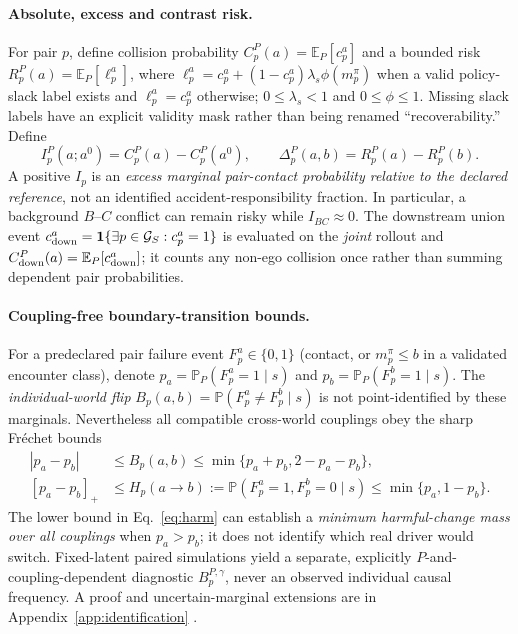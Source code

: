 \documentclass[10pt]{article}
\newcommand{\E}{\mathbb{E}}
\newcommand{\Prob}{\mathbb{P}}
\newcommand{\ind}{\mathbf{1}}
\newcommand{\cG}{\mathcal{G}}\newcommand{\cK}{\mathcal{K}}
\newcommand{\relu}[1]{\left[#1\right]_+}
\begin{document}
\paragraph{Absolute, excess and contrast risk.}
For pair $p$, define collision probability $C_p^P(a)=\E_P[c_p^a]$ and a bounded risk $R_p^P(a)=\E_P[\ell_p^a]$, where $\ell_p^a=c_p^a+(1-c_p^a)\lambda_s\phi(m_p^\pi)$ when a valid policy-slack label exists and $\ell_p^a=c_p^a$ otherwise; $0\leq\lambda_s<1$ and $0\leq\phi\leq1$. Missing slack labels have an explicit validity mask rather than being renamed ``recoverability.'' Define
\begin{equation}
 I_p^P(a;a^0)=C_p^P(a)-C_p^P(a^0),\qquad
 \Delta_p^P(a,b)=R_p^P(a)-R_p^P(b).
 \label{eq:risk}
\end{equation}
A positive $I_p$ is an \emph{excess marginal pair-contact probability relative to the declared reference}, not an identified accident-responsibility fraction. In particular, a background $B$--$C$ conflict can remain risky while $I_{BC}\approx0$. The downstream union event $c_{\rm down}^a=\ind\{\exists p\in\cG_S:c_p^a=1\}$ is evaluated on the \emph{joint} rollout and $C_{\rm down}^P(a)=\E_P[c_{\rm down}^a]$; it counts any non-ego collision once rather than summing dependent pair probabilities.

\paragraph{Coupling-free boundary-transition bounds.}
For a predeclared pair failure event $F_p^a\in\{0,1\}$ (contact, or $m_p^\pi\leq b$ in a validated encounter class), denote $p_a=\Prob_P(F_p^a=1\mid s)$ and $p_b=\Prob_P(F_p^b=1\mid s)$. The \emph{individual-world flip} $B_p(a,b)=\Prob(F_p^a\ne F_p^b\mid s)$ is not point-identified by these marginals. Nevertheless all compatible cross-world couplings obey the sharp Fr\'echet bounds
\begin{align}
 |p_a-p_b|&\leq B_p(a,b)\leq\min\{p_a+p_b,2-p_a-p_b\}, \label{eq:frechet}\\
 \relu{p_a-p_b}&\leq H_p(a\!\to\! b):=\Prob(F_p^a=1,F_p^b=0\mid s)
 \leq\min\{p_a,1-p_b\}.\label{eq:harm}
\end{align}
The lower bound in Eq.~\eqref{eq:harm} can establish a \emph{minimum harmful-change mass over all couplings} when $p_a>p_b$; it does not identify which real driver would switch. Fixed-latent paired simulations yield a separate, explicitly $P$-and-coupling-dependent diagnostic $B_p^{P,\gamma}$, never an observed individual causal frequency. A proof and uncertain-marginal extensions are in Appendix~\ref{app:identification} \parencite{zhang2025individual}.
\end{document}
